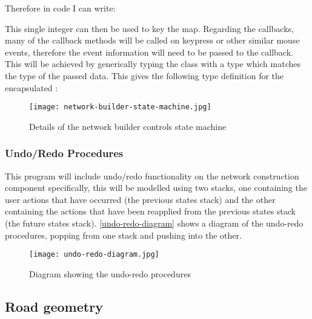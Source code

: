             Therefore in code I can write:


            This single integer can then be used to key the map. Regarding the callbacks, many of the callback methods will be called on keypress or other similar mouse events, therefore the event information will need to be passed to the callback. This will be achieved by generically typing the class with a  type which matches the type of the passed data. This gives the following type definition for the encapsulated :


            \begin{figure}
                \centering
                \texttt{[image: network-builder-state-machine.jpg]}
                \caption{Details of the network builder controls state machine}
                \label{network-builder-state-machine}
            \end{figure}

        \subsubsection{Undo/Redo Procedures}
            This program will include undo/redo functionality on the network construction component specifically, this will be modelled using two stacks, one containing the user actions that have occurred (the previous states stack) and the other containing the actions that have been reapplied from the previous states stack (the future states stack). \autoref{undo-redo-diagram} shows a diagram of the undo-redo procedures, popping from one stack and pushing into the other.

            \begin{figure}
                \centering
                \texttt{[image: undo-redo-diagram.jpg]}
                \caption{Diagram showing the undo-redo procedures}
                \label{undo-redo-diagram}
            \end{figure}

    \subsection{Road geometry}

